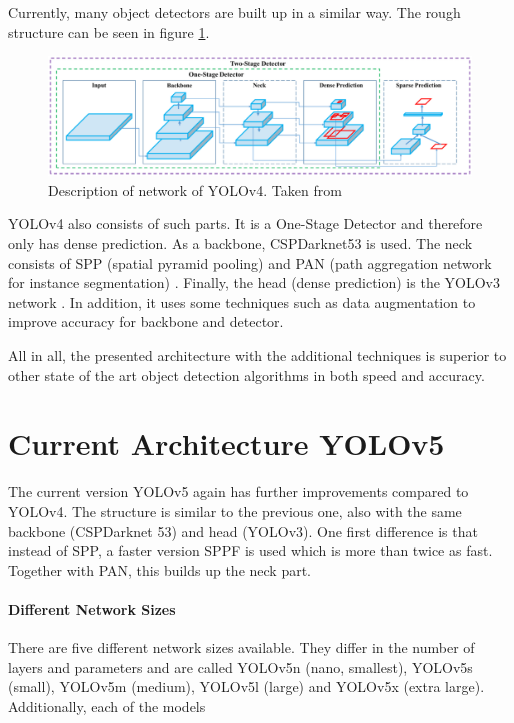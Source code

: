 Currently, many object detectors are built up in a similar way. The rough structure can be seen in figure \ref{fig:yolov4_architecture}.

\begin{figure}[htb!]
	\centering
	\includegraphics[scale=0.31]{figures/yolov4_architecture.png}
	\caption{Description of network of YOLOv4. Taken from \cite{yolov4}}
	\label{fig:yolov4_architecture}
\end{figure}

YOLOv4 \cite{yolov4} also consists of such parts. It is a One-Stage Detector and therefore only has dense prediction. As a backbone, CSPDarknet53 \cite{Wang_2020_CVPR_Workshops} is used. The neck consists of SPP (spatial pyramid pooling) \cite{7005506} and PAN (path aggregation network for instance segmentation) \cite{Liu_2018_CVPR}. Finally, the head (dense prediction) is the YOLOv3 network \cite{yolov3}. In addition, it uses some techniques such as data augmentation to improve accuracy for backbone and detector. 

All in all, the presented architecture with the additional techniques is superior to other state of the art object detection algorithms in both speed and accuracy. 

\section{Current Architecture YOLOv5} 

The current version YOLOv5 \cite{yolov5} again has further improvements compared to YOLOv4. The structure is similar to the previous one, also with the same backbone (CSPDarknet 53) and head (YOLOv3). One first difference is that instead of SPP, a faster version SPPF is used which is more than twice as fast. Together with PAN, this builds up the neck part.

\paragraph{Different Network Sizes}
There are five different network sizes available. They differ in the number of layers and parameters and are called YOLOv5n (nano, smallest), YOLOv5s (small), YOLOv5m (medium), YOLOv5l (large) and YOLOv5x (extra large). Additionally, each of the models 

